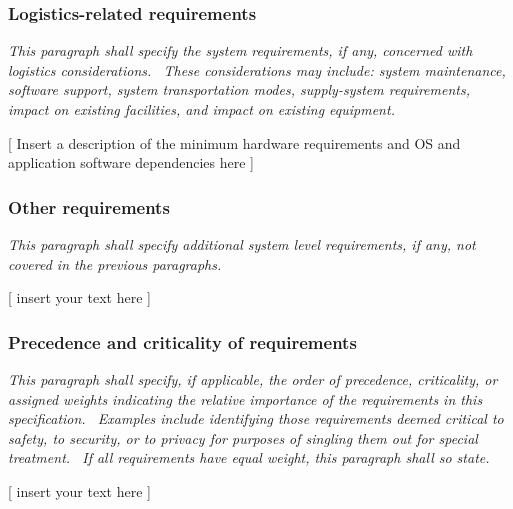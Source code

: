 \documentclass[twoside,letterpaper]{article}
\begin{document}
\subsubsection[Logistics{}-related
requirements]{\rmfamily\bfseries\color{black}
Logistics-related requirements}
{\itshape\color{black}
This paragraph shall specify the system requirements, if any, concerned
with logistics considerations. \ These considerations may include:
system maintenance, software support, system transportation modes,
supply-system requirements, impact on existing facilities, and impact
on existing equipment. \ }

{\color{black}
[ Insert a description of the minimum hardware requirements and OS and
application software dependencies here ]}

\subsubsection[Other
requirements]{\rmfamily\bfseries\color{black}
Other requirements}
{\itshape\color{black}
This paragraph shall specify additional system level requirements, if
any, not covered in the previous paragraphs.}

{\color{black}
[ insert your text here ]}

\subsubsection[Precedence and criticality of
requirements]{\rmfamily\bfseries\color{black}
Precedence and criticality of requirements}
{\itshape\color{black}
This paragraph shall specify, if applicable, the order of precedence,
criticality, or assigned weights indicating the relative importance of
the requirements in this specification. \ Examples include identifying
those requirements deemed critical to safety, to security, or to
privacy for purposes of singling them out for special treatment. \ If
all requirements have equal weight, this paragraph shall so state. }

{\color{black}
[ insert your text here ]}
\end{document}
